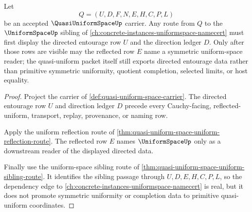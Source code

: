 \begin{theorem}
\label{thm:quasi-uniform-space-directed-uniform-space-dependency}
Let
$$
Q=(U,D,F,N,E,H,C,P,L)
$$
be an accepted $\QuasiUniformSpaceUp$ carrier. Any route from $Q$ to the $\UniformSpaceUp$ sibling of \autoref{ch:concrete-instances-uniformspace-namecert} must first display the directed entourage row $U$ and the direction ledger $D$. Only after those rows are visible may the reflected row $E$ name a symmetric uniform-space reader; the quasi-uniform packet itself still exports directed entourage data rather than primitive symmetric uniformity, quotient completion, selected limits, or host equality.
\end{theorem}
\begin{proof}
Project the carrier of \autoref{def:quasi-uniform-space-carrier}. The directed entourage row $U$ and direction ledger $D$ precede every Cauchy-facing, reflected-uniform, transport, replay, provenance, or naming row.

Apply the uniform reflection route of \autoref{thm:quasi-uniform-space-uniform-reflection-route}. The reflected row $E$ names $\UniformSpaceUp$ only as a downstream reader of the displayed directed data.

Finally use the uniform-space sibling route of \autoref{thm:quasi-uniform-space-uniform-sibling-route}. It identifies the sibling passage through $U,D,E,H,C,P,L$, so the dependency edge to \autoref{ch:concrete-instances-uniformspace-namecert} is real, but it does not promote symmetric uniformity or completion data to primitive quasi-uniform coordinates.
\end{proof}
